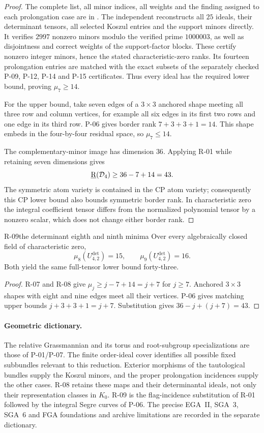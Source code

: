 \begin{proof}
The complete list, all minor indices, all weights and the
finding assigned to each prolongation case are in
.
The independent  reconstructs
all $25$ ideals, their determinant tensors, all selected
Koszul entries and the support minors directly. It verifies
$2997$ nonzero minors modulo the verified prime $1000003$,
as well as disjointness and correct weights of the support-factor
blocks. These certify nonzero integer minors, hence the stated
characteristic-zero ranks. Its fourteen prolongation entries
are matched with the exact subsets of the separately checked
P-09, P-12, P-14 and P-15 certificates. Thus every ideal has
the required lower bound, proving $\mu_7\geq14$.

For the upper bound, take seven edges of a $3\times3$
anchored shape meeting all three row and column vertices,
for example all six edges in its first two rows and one
edge in its third row. P-06 gives border rank
$7+3+3+1=14$. This shape embeds in the four-by-four residual
space, so $\mu_7\leq14$.

The complementary-minor image has dimension $36$.
Applying R-01 while retaining seven dimensions gives
\[
 \underline{\mathrm R}(\mathcal D_4)\geq36-7+14=43.
\]
The symmetric atom variety is contained in the CP atom
variety; consequently this CP lower bound also bounds
symmetric border rank. In characteristic zero the integral
coefficient tensor differs from the normalized polynomial
tensor by a nonzero scalar, which does not change either
border rank.
\end{proof}

\begin{finding}{R-09}{the determinant eighth and ninth minima}
Over every algebraically closed field of characteristic zero,
\[
 \mu_8(U^{\det}_{4,2})=15,\qquad
 \mu_9(U^{\det}_{4,2})=16.
\]
Both yield the same full-tensor lower bound forty-three.
\end{finding}
\begin{proof}
R-07 and R-08 give $\mu_j\geq j-7+14=j+7$ for $j\geq7$.
Anchored $3\times3$ shapes with eight and nine edges meet
all their vertices. P-06 gives matching upper bounds
$j+3+3+1=j+7$. Substitution gives $36-j+(j+7)=43$.
\end{proof}

\paragraph{Geometric dictionary.}
The relative Grassmannian and its torus and root-subgroup
specializations are those of P-01/P-07. The finite order-ideal
cover identifies all possible fixed subbundles relevant to
this reduction. Exterior morphisms of the tautological
bundles supply the Koszul minors, and the proper prolongation
incidences supply the other cases. R-08 retains these maps
and their determinantal ideals, not only their representation
classes in $K_0$. R-09 is the flag-incidence substitution
of R-01 followed by the integral Segre curves of P-06.
The precise EGA~II, SGA~3, SGA~6 and FGA foundations and
archive limitations are recorded in the separate dictionary.
